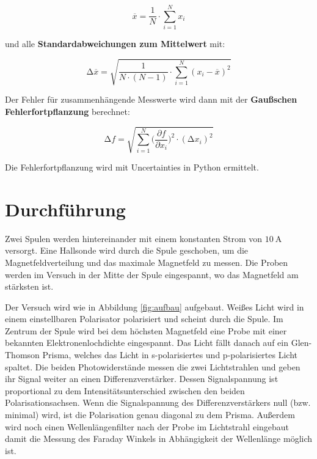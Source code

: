 \begin{equation}
	\overline{x} = \frac{1}{N} \cdot \sum_{i=1}^N x_i
	\label{eqn:Mittelwert}
\end{equation}

und alle \textbf{Standardabweichungen zum Mittelwert} mit:

\begin{equation}
	\increment\overline{x} = \sqrt{\frac{1}{N\cdot(N-1)}\cdot\sum_{i=1}^N (x_i-\overline{x})^2}
	\label{eqn:St_Mittelwert}
\end{equation}

Der Fehler für zusammenhängende Messwerte wird dann mit der \textbf{Gaußschen
	Fehlerfortpflanzung} berechnet:

\begin{equation}
	\increment{f} = \sqrt{ \sum_{i = 1}^{N}  \biggl(\frac{\partial{f}}{\partial{x_i}}\biggr)^2\cdot(\increment{x_i})^2}
	\label{eqn:Gauss}
\end{equation}

Die Fehlerfortpflanzung wird mit Uncertainties in Python \cite{uncertainties}
ermittelt.


\section{Durchführung \cite{man}}%
Zwei Spulen werden hintereinander mit einem konstanten Strom von
$\qty{10}{\ampere}$ versorgt. Eine Hallsonde wird durch die Spule geschoben, um
die Magnetfeldverteilung und das maximale Magnetfeld zu messen. Die Proben werden im Versuch in der
Mitte der Spule eingespannt, wo das Magnetfeld am stärksten ist.

Der Versuch wird wie in Abbildung \ref{fig:aufbau} aufgebaut. Weißes Licht wird
in einem einstellbaren Polarisator polarisiert und scheint durch die Spule. Im
Zentrum der Spule wird bei dem höchsten Magnetfeld eine Probe mit einer
bekannten Elektronenlochdichte eingespannt. Das Licht fällt danach auf ein
Glen-Thomson Prisma, welches das Licht in s-polarisiertes und p-polarisiertes
Licht spaltet. Die beiden Photowiderstände messen die zwei Lichtstrahlen und
geben ihr Signal weiter an einen Differenzverstärker. Dessen Signalspannung ist
proportional zu dem Intensitätsunterschied zwischen den beiden
Polarisationsachsen. Wenn die Signalspannung des Differenzverstärkers null
(bzw. minimal) wird, ist die Polarisation genau diagonal zu dem Prisma.
Außerdem wird noch einen Wellenlängenfilter nach der Probe im Lichtstrahl
eingebaut damit die Messung des Faraday Winkels in Abhängigkeit der Wellenlänge
möglich ist.

